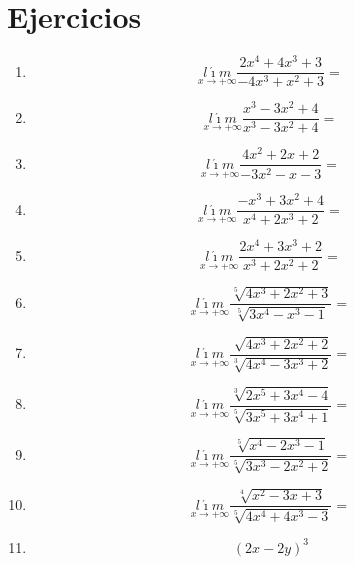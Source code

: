 \documentclass[oneside,spanish,letter]{article}
\begin{document}
\section{Ejercicios}
\begin{enumerate}
 \item $$\underset{x\rightarrow +\infty}{l\acute{\imath}m} \frac{2x^4+4x^3+3}{-4x^3+x^2+3}=$$
 \item $$\underset{x\rightarrow +\infty}{l\acute{\imath}m} \frac{x^3-3x^2+4}{x^3-3x^2+4}=$$
 \item $$\underset{x\rightarrow +\infty}{l\acute{\imath}m} \frac{4x^2+2x+2}{-3x^2-x-3}=$$
 \item $$\underset{x\rightarrow +\infty}{l\acute{\imath}m} \frac{-x^3+3x^2+4}{x^4+2x^3+2}=$$
 \item $$\underset{x\rightarrow +\infty}{l\acute{\imath}m} \frac{2x^4+3x^3+2}{x^3+2x^2+2}=$$
 \item $$\underset{x\rightarrow +\infty}{l\acute{\imath}m} \frac{\sqrt[5]{4x^3+2x^2+3}}{\sqrt[5]{3x^4-x^3-1}}=$$
 \item $$\underset{x\rightarrow +\infty}{l\acute{\imath}m} \frac{\sqrt[]{4x^3+2x^2+2}}{\sqrt[3]{4x^4-3x^3+2}}=$$
 \item $$\underset{x\rightarrow +\infty}{l\acute{\imath}m} \frac{\sqrt[3]{2x^5+3x^4-4}}{\sqrt[5]{3x^5+3x^4+1}}=$$
 \item $$\underset{x\rightarrow +\infty}{l\acute{\imath}m} \frac{\sqrt[5]{x^4-2x^3-1}}{\sqrt[5]{3x^3-2x^2+2}}=$$
 \item $$\underset{x\rightarrow +\infty}{l\acute{\imath}m} \frac{\sqrt[4]{x^2-3x+3}}{\sqrt[5]{4x^4+4x^3-3}}=$$
\item $$(2x-2y)^3$$
 \end{enumerate}
  \newpage
\end{document}
